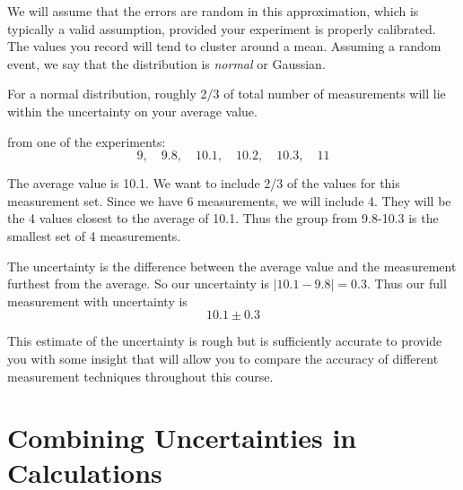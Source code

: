 We will assume that the errors are random in this approximation, which is typically a valid assumption, provided your experiment is properly calibrated.  The values you record will tend to cluster around a mean.  Assuming a random event, we say that the distribution is \textit{normal} or Gaussian.  

For a normal distribution, roughly 2/3 of total number of measurements will lie within the uncertainty on your average value.

 from one of the experiments:
\begin{equation*}
	9,\quad9.8,\quad10.1,\quad10.2,\quad10.3,\quad11
\end{equation*}

The average value is 10.1.  We want to include 2/3 of the values for this measurement set.  Since we have 6 measurements, we will include 4.  They will be the 4 values closest to the average of 10.1.  Thus the group from 9.8-10.3 is the smallest set of 4 measurements.  

The uncertainty is the difference between the average value and the measurement furthest from the average.  So our uncertainty is $\left|10.1-9.8\right|=0.3$.  Thus our full measurement with uncertainty is
\begin{equation*}
	10.1\pm0.3
\end{equation*}

This estimate of the uncertainty is rough but is sufficiently accurate to provide you with some insight that will allow you to compare the accuracy of different measurement techniques throughout this course.

\section{Combining Uncertainties in Calculations}



